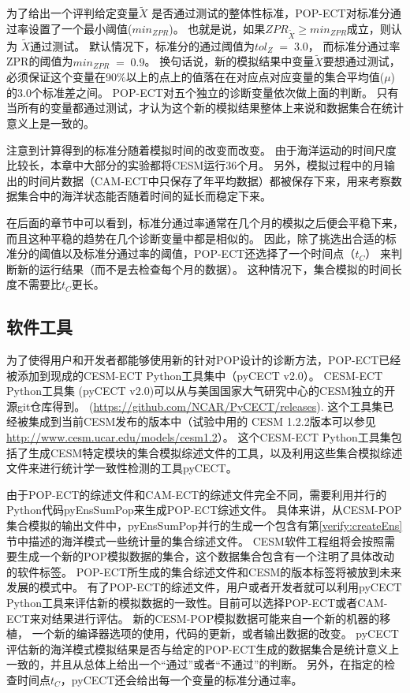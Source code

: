 为了给出一个评判给定变量$\tilde{X}$ 是否通过测试的整体性标准，POP-ECT对标准分通过率设置了一个最小阈值($min_{ZPR}$)。 
也就是说，如果$ZPR_{\tilde{X}} \geq min_{ZPR}$成立，则认为 $\tilde{X}$通过测试。
默认情况下，标准分的通过阈值为$tol_{Z} \; = \; 3.0$， 而标准分通过率ZPR的阈值为$min_{ZPR} \; = \; 0.9$。 
换句话说，新的模拟结果中变量$\tilde{X}$要想通过测试，必须保证这个变量在90$\%$以上的点上的值落在在对应点对应变量的集合平均值($\mu$) 的$3.0$个标准差之间。
POP-ECT对五个独立的诊断变量依次做上面的判断。 
只有当所有的变量都通过测试，才认为这个新的模拟结果整体上来说和数据集合在统计意义上是一致的。


 
注意到计算得到的标准分随着模拟时间的改变而改变。 
由于海洋运动的时间尺度比较长，本章中大部分的实验都将CESM运行36个月。
另外，模拟过程中的月输出的时间片数据（CAM-ECT中只保存了年平均数据）都被保存下来，用来考察数据集合中的海洋状态能否随着时间的延长而稳定下来。 



在后面的章节中可以看到，标准分通过率通常在几个月的模拟之后便会平稳下来，而且这种平稳的趋势在几个诊断变量中都是相似的。 
因此，除了挑选出合适的标准分的阈值以及标准分通过率的阈值，POP-ECT还选择了一个时间点（$t_C$）
来判断新的运行结果（而不是去检查每个月的数据）。 
这种情况下，集合模拟的时间长度不需要比$t_C$更长。 

\subsection{软件工具}
\label{verify:ECTsoft}

为了使得用户和开发者都能够使用新的针对POP设计的诊断方法，POP-ECT已经被添加到现成的CESM-ECT Python工具集中（pyCECT v2.0）。
CESM-ECT Python工具集 (pyCECT v2.0)可以从与美国国家大气研究中心的CESM独立的开源git仓库得到。 (\url{https://github.com/NCAR/PyCECT/releases}). 
这个工具集已经被集成到当前CESM发布的版本中（试验中用的 CESM 1.2.2版本可以参见\url{http://www.cesm.ucar.edu/models/cesm1.2}）。
这个CESM-ECT Python工具集包括了生成CESM特定模块的集合模拟综述文件的工具，以及利用这些集合模拟综述文件来进行统计学一致性检测的工具pyCECT。

由于POP-ECT的综述文件和CAM-ECT的综述文件完全不同，需要利用并行的Python代码pyEnsSumPop来生成POP-ECT综述文件。
具体来讲，从CESM-POP集合模拟的输出文件中，pyEnsSumPop并行的生成一个包含有第\ref{verify:createEns}节中描述的海洋模式一些统计量的集合综述文件。 
CESM软件工程组将会按照需要生成一个新的POP模拟数据的集合，这个数据集合包含有一个注明了具体改动的软件标签。
POP-ECT所生成的集合综述文件和CESM的版本标签将被放到未来发展的模式中。 
有了POP-ECT的综述文件，用户或者开发者就可以利用pyCECT Python工具来评估新的模拟数据的一致性。目前可以选择POP-ECT或者CAM-ECT来对结果进行评估。
新的CESM-POP模拟数据可能来自一个新的机器的移植， 一个新的编译器选项的使用，代码的更新，或者输出数据的改变。
pyCECT评估新的海洋模式模拟结果是否与给定的POP-ECT生成的数据集合是统计意义上一致的，并且从总体上给出一个“通过”或者“不通过”的判断。
另外，在指定的检查时间点$t_C$，pyCECT还会给出每一个变量的标准分通过率。 

